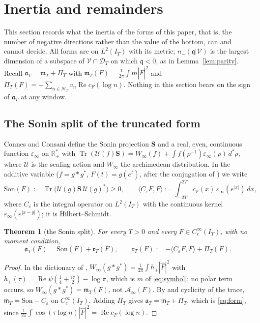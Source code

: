 \documentclass[11pt]{amsart}
\newtheorem{theorem}{Theorem}[section]
\theoremstyle{definition}
\theoremstyle{remark}
\newcommand{\R}{\mathbb R}
\newcommand{\Rel}{\operatorname{Re}}
\newcommand{\IT}{I_T}
\newcommand{\Fh}{\widehat F}
\newcommand{\cF}{c_F}
\newcommand{\NT}{\mathcal N_T}
\newcommand{\Ainf}{\mathcal A_\infty}
\newcommand{\PiT}{\Pi_T}
\newcommand{\mT}{\mathfrak m_T}
\begin{document}
\section{Inertia and remainders}\label{sec:inertia}

This section records what the inertia of the forms of this paper, that is, the number of negative
directions rather than the value of the bottom, can and cannot decide. All forms are on $L^2(\IT)$ with
its metric; $n_-(\mathfrak q|\mathcal V)$ is the largest dimension of a subspace of $\mathcal V\cap\mathcal D_T$ on which
$\mathfrak q<0$, as in Lemma~\ref{lem:parity}. Recall $\mathfrak a_T=\mT+\PiT$ with $\mT(F)=\frac1{2\pi}\int m|\Fh|^2$
and $\PiT(F)=-\sum_{n\in\NT}v_n\Rel\cF(\log n)$. Nothing in this section bears on the sign of $\mathfrak a_T$ at any
window.

\subsection{The Sonin split of the truncated form}
Connes and Consani \cite[Thm.~4.7, (83)--(84)]{ConnesConsani2021} define the Sonin projection $\mathbf S$ and a
real, even, continuous function $\varepsilon_\infty$ on $\R_+^*$ with
$\operatorname{Tr}(\mathcal U(f)\mathbf S)=W_\infty(f)+\int f(\rho^{-1})\varepsilon_\infty(\rho)\,d^*\rho$, where $\mathcal U$ is the
scaling action and $W_\infty$ the archimedean distribution. In the additive variable ($f=g*g^*$, $F(t)=g(e^t)$,
after the conjugation of \cite[App.~A]{ConnesConsani2021}) we write
\[
\mathrm{Son}(F):=\operatorname{Tr}\big(\mathcal U(g)\mathbf S\,\mathcal U(g)^*\big)\ge0,\qquad
\langle C_\varepsilon F,F\rangle:=\int_{-2T}^{2T}\cF(x)\,\varepsilon_\infty(e^{|x|})\,dx ,
\]
where $C_\varepsilon$ is the integral operator on $L^2(\IT)$ with the continuous kernel $\varepsilon_\infty(e^{|x-y|})$; it
is Hilbert--Schmidt.

\begin{theorem}[the Sonin split]\label{thm:inertia-split}
For every $T>0$ and every $F\in C_c^\infty(\IT)$, with no moment condition,
\[
\mathfrak a_T(F)=\mathrm{Son}(F)+\mathfrak r_T(F),\qquad
\mathfrak r_T(F):=-\langle C_\varepsilon F,F\rangle+\PiT(F).
\]
\end{theorem}
\begin{proof}
In the dictionary of \cite[(152)--(154)]{ConnesConsani2021}, $W_\infty(g*g^*)=\frac1{2\pi}\int h_+|\Fh|^2$ with
$h_+(\tau)=\Rel\psi(\frac14+\frac{i\tau}2)-\log\pi$, which is $m$ of \eqref{eq:symbol}; no polar term occurs, so
$W_\infty(g*g^*)=\mT(F)$, not $\Ainf(F)$. By \cite[(83)]{ConnesConsani2021} and cyclicity of the trace,
$\mT=\mathrm{Son}-C_\varepsilon$ on $C_c^\infty(\IT)$. Adding $\PiT$ gives $\mathfrak a_T=\mT+\PiT$, which is \eqref{eq:form},
since $\frac1{2\pi}\int\cos(\tau\log n)|\Fh|^2=\Rel\cF(\log n)$.
\end{proof}
\end{document}
